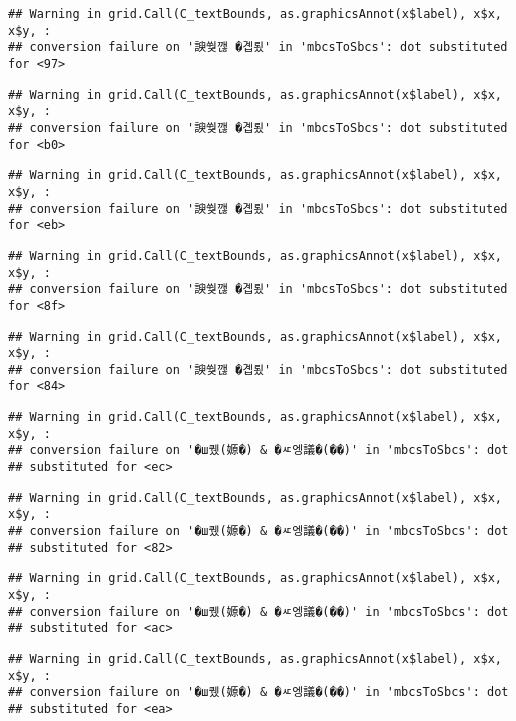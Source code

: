 \documentclass[
]{article}
\begin{document}
\begin{verbatim}
## Warning in grid.Call(C_textBounds, as.graphicsAnnot(x$label), x$x, x$y, :
## conversion failure on '諛쒖깮 �곕룄' in 'mbcsToSbcs': dot substituted for <97>
\end{verbatim}

\begin{verbatim}
## Warning in grid.Call(C_textBounds, as.graphicsAnnot(x$label), x$x, x$y, :
## conversion failure on '諛쒖깮 �곕룄' in 'mbcsToSbcs': dot substituted for <b0>
\end{verbatim}

\begin{verbatim}
## Warning in grid.Call(C_textBounds, as.graphicsAnnot(x$label), x$x, x$y, :
## conversion failure on '諛쒖깮 �곕룄' in 'mbcsToSbcs': dot substituted for <eb>
\end{verbatim}

\begin{verbatim}
## Warning in grid.Call(C_textBounds, as.graphicsAnnot(x$label), x$x, x$y, :
## conversion failure on '諛쒖깮 �곕룄' in 'mbcsToSbcs': dot substituted for <8f>
\end{verbatim}

\begin{verbatim}
## Warning in grid.Call(C_textBounds, as.graphicsAnnot(x$label), x$x, x$y, :
## conversion failure on '諛쒖깮 �곕룄' in 'mbcsToSbcs': dot substituted for <84>
\end{verbatim}

\begin{verbatim}
## Warning in grid.Call(C_textBounds, as.graphicsAnnot(x$label), x$x, x$y, :
## conversion failure on '�ш퀬(嫄�) & �ㅼ엥議�(��)' in 'mbcsToSbcs': dot
## substituted for <ec>
\end{verbatim}

\begin{verbatim}
## Warning in grid.Call(C_textBounds, as.graphicsAnnot(x$label), x$x, x$y, :
## conversion failure on '�ш퀬(嫄�) & �ㅼ엥議�(��)' in 'mbcsToSbcs': dot
## substituted for <82>
\end{verbatim}

\begin{verbatim}
## Warning in grid.Call(C_textBounds, as.graphicsAnnot(x$label), x$x, x$y, :
## conversion failure on '�ш퀬(嫄�) & �ㅼ엥議�(��)' in 'mbcsToSbcs': dot
## substituted for <ac>
\end{verbatim}

\begin{verbatim}
## Warning in grid.Call(C_textBounds, as.graphicsAnnot(x$label), x$x, x$y, :
## conversion failure on '�ш퀬(嫄�) & �ㅼ엥議�(��)' in 'mbcsToSbcs': dot
## substituted for <ea>
\end{verbatim}
\end{document}
